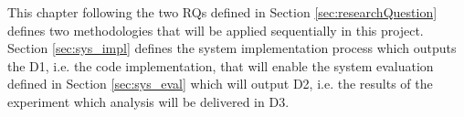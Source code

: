 This chapter following the two \glspl{RQ} defined in Section \ref{sec:researchQuestion} defines two methodologies that will be applied sequentially in this project. Section \ref{sec:sys_impl} defines the system implementation process which outputs the D1, i.e. the code implementation, that will enable the system evaluation defined in Section \ref{sec:sys_eval} which will output D2, i.e. the results of the experiment which analysis will be delivered in D3.